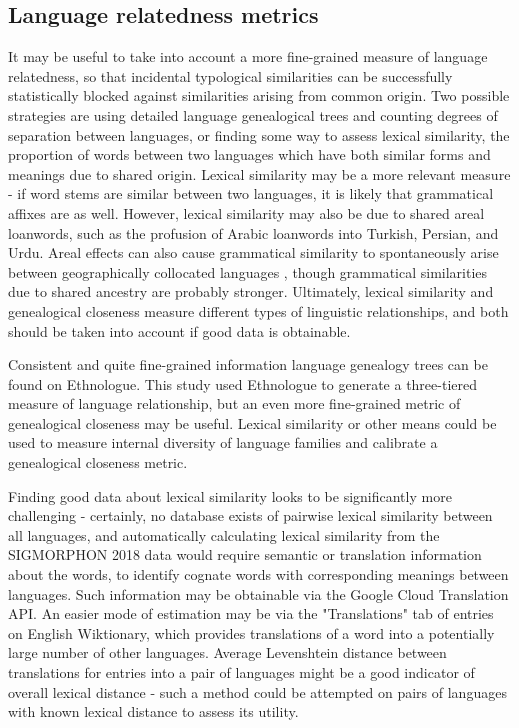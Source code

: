 \subsection{Language relatedness metrics}

It may be useful to take into account a more fine-grained measure of language relatedness, so that incidental typological similarities can be successfully statistically blocked against similarities arising from common origin. Two possible strategies are using detailed language genealogical trees and counting degrees of separation between languages, or finding some way to assess lexical similarity, the proportion of words between two languages which have both similar forms and meanings due to shared origin. Lexical similarity may be a more relevant measure - if word stems are similar between two languages, it is likely that grammatical affixes are as well. However, lexical similarity may also be due to shared areal loanwords, such as the profusion of Arabic loanwords into Turkish, Persian, and Urdu. Areal effects can also cause grammatical similarity to spontaneously arise between geographically collocated languages \parencite{Ponti2018}, though grammatical similarities due to shared ancestry are probably stronger. Ultimately, lexical similarity and genealogical closeness measure different types of linguistic relationships, and both should be taken into account if good data is obtainable.

Consistent and quite fine-grained information language genealogy trees can be found on Ethnologue. This study used Ethnologue to generate a three-tiered measure of language relationship, but an even more fine-grained metric of genealogical closeness may be useful. Lexical similarity or other means could be used to measure internal diversity of language families and calibrate a genealogical closeness metric.

Finding good data about lexical similarity looks to be significantly more challenging - certainly, no database exists of pairwise lexical similarity between all languages, and automatically calculating lexical similarity from the SIGMORPHON 2018 data would require semantic or translation information about the words, to identify cognate words with corresponding meanings between languages. Such information may be obtainable via the Google Cloud Translation API. An easier mode of estimation may be via the "Translations" tab of entries on English Wiktionary, which provides translations of a word into a potentially large number of other languages. Average Levenshtein distance between translations for entries into a pair of languages might be a good indicator of overall lexical distance - such a method could be attempted on pairs of languages with known lexical distance to assess its utility.


